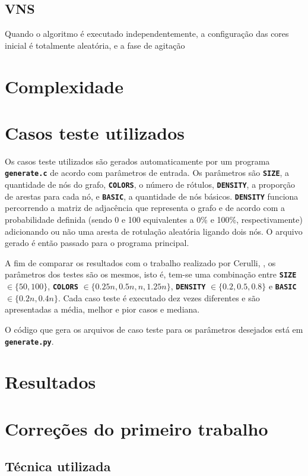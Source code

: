 \documentclass[12pt, a4paper]{article}
\newcommand{\ic}[1]{\textbf{\lstinline{#1}}}
\begin{document}
\subsection{VNS}
Quando o algoritmo é executado independentemente, a configuração das cores
inicial é totalmente aleatória, e a fase de agitação

\section{Complexidade}

\section{Casos teste utilizados}
Os casos teste utilizados são gerados automaticamente por um programa
\ic{generate.c} de acordo com parâmetros de entrada. Os parâmetros são
\ic{SIZE}, a quantidade de nós do grafo, \ic{COLORS}, o número de rótulos,
\ic{DENSITY}, a proporção de arestas para cada nó, e \ic{BASIC}, a quantidade
de nós básicos. \ic{DENSITY} funciona percorrendo a matriz de adjacência que
representa o grafo e de acordo com a probabilidade definida (sendo 0 e 100
equivalentes a 0\% e 100\%, respectivamente) adicionando ou não uma aresta de
rotulação aleatória ligando dois nós. O arquivo gerado é então passado para o
programa principal.

A fim de comparar os resultados com o trabalho realizado por Cerulli,
\cite{cerulli}, os parâmetros dos testes são os mesmos, isto é, tem-se uma
combinação entre \ic{SIZE} $ \in \{50, 100\} $, \ic{COLORS} $ \in \{0.25n,
0.5n, n, 1.25n\} $, \ic{DENSITY} $ \in \{0.2, 0.5, 0.8\}$ e \ic{BASIC} $ \in
\{0.2n, 0.4n\} $. Cada caso teste é executado dez vezes diferentes e são
apresentadas a média, melhor e pior casos e mediana.

O código que gera os arquivos de caso teste para os parâmetros desejados está
em \ic{generate.py}.

\section{Resultados}

\section{Correções do primeiro trabalho}
\subsection{Técnica utilizada}
\end{document}

